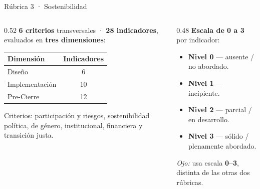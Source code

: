 \documentclass[aspectratio=169,11pt]{beamer}
\newcommand{\redlead}[1]{\textbf{\color{iloRed}#1}}
\newcommand{\bluelead}[1]{\textbf{\color{iloBlue}#1}}
\begin{document}
\begin{frame}{Rúbrica 3 · Sostenibilidad}
  \small
  \begin{columns}[T]
    \begin{column}{0.52\textwidth}
      \textbf{6 criterios} transversales · \textbf{28 indicadores}, evaluados en \bluelead{tres dimensiones}:
      \renewcommand{\arraystretch}{1.3}
      \begin{tabular}{@{}p{3.6cm}c@{}}
        \toprule
        \rowcolor{iloBlue}\color{white}\textbf{Dimensión} & \color{white}\textbf{Indicadores}\\
        \midrule
        Diseño & 6\\
        \rowcolor{iloGrayLt}Implementación & 10\\
        Pre-Cierre & 12\\
        \bottomrule
      \end{tabular}
      \vspace{0.15cm}\par
      {\footnotesize Criterios: participación y riesgos, sostenibilidad política, de género, institucional, financiera y transición justa.}
    \end{column}
    \begin{column}{0.48\textwidth}
      \textbf{Escala de 0 a 3} por indicador:
      \begin{itemize}
        \item \redlead{Nivel 0} — ausente / no abordado.
        \item \textbf{Nivel 1} — incipiente.
        \item \textbf{Nivel 2} — parcial / en desarrollo.
        \item \bluelead{Nivel 3} — sólido / plenamente abordado.
      \end{itemize}
      \vspace{0.15cm}
      \textit{Ojo:} usa escala \redlead{0--3}, distinta de las otras dos rúbricas.
    \end{column}
  \end{columns}
\end{frame}

\end{document}
